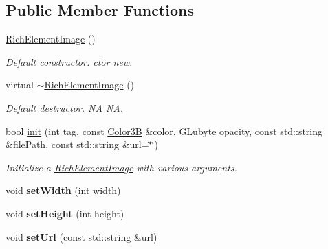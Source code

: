 \subsection*{Public Member Functions}
\begin{DoxyCompactItemize}
\item 
\mbox{\label{classui_1_1RichElementImage_a72aa8d3dcb46e4e93c9d2526482fce06}} 
\hyperlink{classui_1_1RichElementImage_a72aa8d3dcb46e4e93c9d2526482fce06}{Rich\+Element\+Image} ()
\begin{DoxyCompactList}\small\item\em Default constructor.  ctor  new. \end{DoxyCompactList}\item 
\mbox{\label{classui_1_1RichElementImage_a07999205fee48600bd1ca5fe28648721}} 
virtual \hyperlink{classui_1_1RichElementImage_a07999205fee48600bd1ca5fe28648721}{$\sim$\+Rich\+Element\+Image} ()
\begin{DoxyCompactList}\small\item\em Default destructor.  NA  NA. \end{DoxyCompactList}\item 
bool \hyperlink{classui_1_1RichElementImage_a1cdc1c2bdcb2895583771b9feb64dbec}{init} (int tag, const \hyperlink{structColor3B}{Color3B} \&color, G\+Lubyte opacity, const std\+::string \&file\+Path, const std\+::string \&url=\char`\"{}\char`\"{})
\begin{DoxyCompactList}\small\item\em Initialize a \hyperlink{classui_1_1RichElementImage}{Rich\+Element\+Image} with various arguments. \end{DoxyCompactList}\item 
\mbox{\label{classui_1_1RichElementImage_a69049cccc71bf5403f6abd8a9af6d333}} 
void {\bfseries set\+Width} (int width)
\item 
\mbox{\label{classui_1_1RichElementImage_a67872946741cc8ae67ef43822c8068ac}} 
void {\bfseries set\+Height} (int height)
\item 
\mbox{\label{classui_1_1RichElementImage_a7671bcda3ba03dba5bf6afdbde767781}} 
void {\bfseries set\+Url} (const std\+::string \&url)

\end{DoxyCompactItemize}
